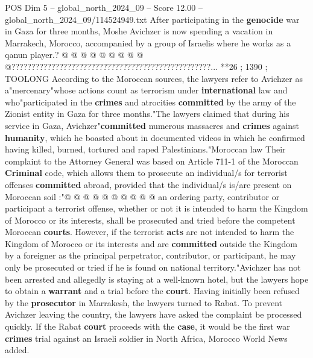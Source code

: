 \begin{textsample}{POS Dim 5 – global\_north\_2024\_09 – Score 12.00 – global\_north\_2024\_09/114524949.txt}
After participating in the \textbf{genocide} war in Gaza for three months, Moshe Avichzer is now spending a vacation in Marrakech, Morocco, accompanied by a group of Israelis where he works as a qanun player.? @ @ @ @ @ @ @ @ @ @??????????????????????????????????????????????????... **26 ; 1390 ; TOOLONG According to the Moroccan sources, the lawyers refer to Avichzer as a"mercenary"whose actions count as terrorism under \textbf{international} law and who"participated in the \textbf{crimes} and atrocities \textbf{committed} by the army of the Zionist entity in Gaza for three months."The lawyers claimed that during his service in Gaza, Avichzer"\textbf{committed} numerous massacres and \textbf{crimes} against \textbf{humanity}, which he boasted about in documented videos in which he confirmed having killed, burned, tortured and raped Palestinians."Moroccan law Their complaint to the Attorney General was based on Article 711-1 of the Moroccan \textbf{Criminal} code, which allows them to prosecute an individual/s for terrorist offenses \textbf{committed} abroad, provided that the individual/s is/are present on Moroccan soil :"@ @ @ @ @ @ @ @ @ @ an ordering party, contributor or participant a terrorist offense, whether or not it is intended to harm the Kingdom of Morocco or its interests, shall be prosecuted and tried before the competent Moroccan \textbf{courts}.
However, if the terrorist \textbf{acts} are not intended to harm the Kingdom of Morocco or its interests and are \textbf{committed} outside the Kingdom by a foreigner as the principal perpetrator, contributor, or participant, he may only be prosecuted or tried if he is found on national territory."Avichzer has not been arrested and allegedly is staying at a well-known hotel, but the lawyers hope to obtain a \textbf{warrant} and a trial before the \textbf{court}.
Having initially been refused by the \textbf{prosecutor} in Marrakesh, the lawyers turned to Rabat.
To prevent Avichzer leaving the country, the lawyers have asked the complaint be processed quickly.
If the Rabat \textbf{court} proceeds with the \textbf{case}, it would be the first war \textbf{crimes} trial against an Israeli soldier in North Africa, Morocco World News added.

\end{textsample}
